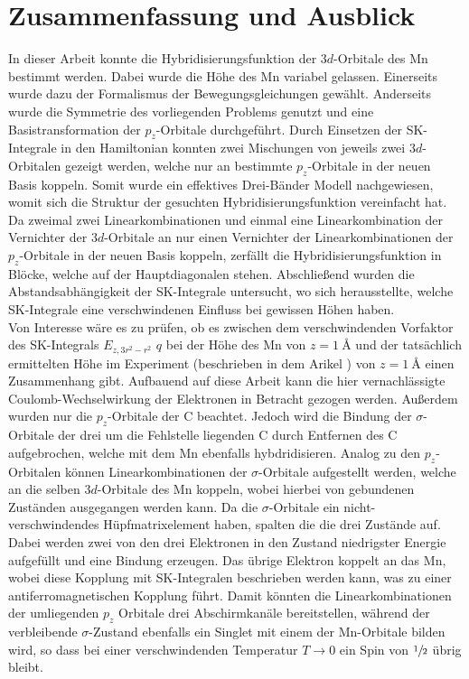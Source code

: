 \chapter{Zusammenfassung und Ausblick}
\label{chap:Zusammenfassung_und_Ausblick}
In dieser Arbeit konnte die Hybridisierungsfunktion der $3d$-Orbitale des Mn bestimmt werden.
Dabei wurde die Höhe des Mn variabel gelassen.
Einerseits wurde dazu der Formalismus der Bewegungsgleichungen gewählt.
Anderseits wurde die Symmetrie des vorliegenden Problems genutzt und eine Basistransformation der $p_z$-Orbitale durchgeführt. 
Durch Einsetzen der SK-Integrale in den Hamiltonian konnten zwei Mischungen von jeweils zwei $3d$-Orbitalen gezeigt werden, welche nur 
an bestimmte $p_z$-Orbitale in der neuen Basis koppeln.
Somit wurde ein effektives Drei-Bänder Modell nachgewiesen, womit sich die Struktur der gesuchten Hybridisierungsfunktion vereinfacht hat. 
Da zweimal zwei Linearkombinationen und einmal eine Linearkombination der Vernichter der $3d$-Orbitale an nur einen Vernichter der Linearkombinationen
der $p_z$-Orbitale in der neuen Basis koppeln, zerfällt die Hybridisierungsfunktion in Blöcke, welche auf der Hauptdiagonalen stehen. 
Abschließend wurden die Abstandsabhängigkeit der SK-Integrale untersucht, wo sich herausstellte, welche SK-Integrale 
eine verschwindenen Einfluss bei gewissen Höhen haben.\\
Von Interesse wäre es zu prüfen, ob es zwischen dem verschwindenden Vorfaktor des SK-Integrals $E_{z,3r^2-r^2}$ $q$ bei der Höhe 
des Mn von $z=\qty{1}{\angstrom}$ und der tatsächlich ermittelten Höhe im Experiment (beschrieben in dem 
Arikel \cite{doi:10.1021/acsnano.1c00139}) von $z=\qty{1}{\angstrom}$ einen Zusammenhang gibt.
Aufbauend auf diese Arbeit kann die hier vernachlässigte Coulomb-Wechselwirkung der Elektronen in Betracht gezogen werden.
Außerdem wurden nur die $p_z$-Orbitale der C beachtet.
Jedoch wird die Bindung der $\sigma$-Orbitale der drei um die Fehlstelle liegenden C durch Entfernen des C
aufgebrochen, welche mit dem Mn ebenfalls hybdridisieren.
Analog zu den $p_z$-Orbitalen können Linearkombinationen der $\sigma$-Orbitale aufgestellt werden, welche an die selben 
$3d$-Orbitale des Mn koppeln, wobei hierbei von gebundenen Zuständen ausgegangen werden kann.
Da die $\sigma$-Orbitale ein nicht-verschwindendes Hüpfmatrixelement haben, spalten die die drei Zustände auf.
Dabei werden zwei von den drei Elektronen in den Zustand niedrigster Energie aufgefüllt und eine Bindung erzeugen. 
Das übrige Elektron koppelt an das Mn, wobei diese Kopplung mit SK-Integralen beschrieben werden kann, was 
zu einer antiferromagnetischen Kopplung führt.
Damit könnten die Linearkombinationen der umliegenden $p_z$ Orbitale drei Abschirmkanäle bereitstellen, während der verbleibende $\sigma$-Zustand
ebenfalls ein Singlet mit einem der Mn-Orbitale bilden wird, so dass bei einer verschwindenden Temperatur $T \to 0$ ein Spin von 
$\sfrac{1}{2}$ übrig bleibt.
